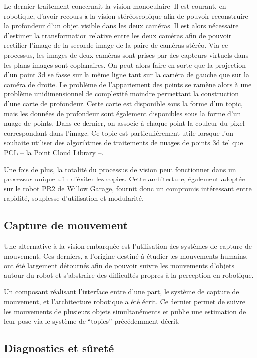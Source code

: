 Le dernier traitement concernait la vision monoculaire. Il est
courant, en robotique, d'avoir recours à la vision stéréoscopique afin
de pouvoir reconstruire la profondeur d'un objet visible dans les deux
caméras. Il est alors nécessaire d'estimer la transformation relative
entre les deux caméras afin de pouvoir rectifier l'image de la seconde
image de la paire de caméras stéréo. Via ce processus, les images de
deux caméras sont prises par des capteurs virtuels dans les plans
images sont coplanaires. On peut alors faire en sorte que la
projection d'un point 3d se fasse sur la même ligne tant sur la caméra
de gauche que sur la caméra de droite. Le problème de l'appariement
des points se ramène alors à une problème unidimensionnel de
complexité moindre permettant la construction d'une carte de
profondeur. Cette carte est disponible sous la forme d'un topic, mais
les données de profondeur sont également disponibles sous la forme
d'un nuage de points. Dans ce dernier, on associe à chaque point la
couleur du pixel correspondant dans l'image. Ce topic est
particulièrement utile lorsque l'on souhaite utiliser des algorihtmes
de traitements de nuages de points 3d tel que PCL -- la Point Cloud
Library --.


Une fois de plus, la totalité du processus de vision peut fonctionner
dans un processus unique afin d'éviter les copies. Cette architecture,
également adoptée sur le robot PR2 de Willow
Garage, fournit donc un compromis intéressant entre rapidité,
souplesse d'utilisation et modularité.


\subsection{Capture de mouvement}

Une alternative à la vision embarquée est l'utilisation des systèmes
de capture de mouvement. Ces derniers, à l'origine destiné à étudier
les mouvements humains, ont été largement détournés afin de pouvoir
suivre les mouvements d'objets autour du robot et s'abstraire des
difficultés propres à la perception en robotique.


Un composant réalisant l'interface entre d'une part, le système de
capture de mouvement, et l'architecture robotique a été écrit. Ce
dernier permet de suivre les mouvements de plusieurs objets
simultanéments et publie une estimation de leur pose via le système de
``topics'' précédemment décrit.


\subsection{Diagnostics et sûreté}

